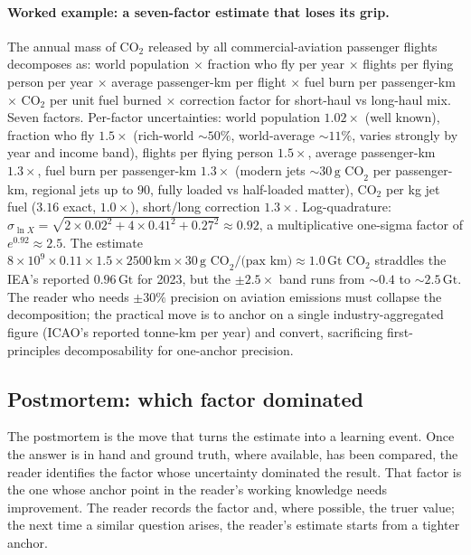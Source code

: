 \paragraph{Worked example: a seven-factor estimate that loses
its grip.} The annual mass of CO$_2$ released by all
commercial-aviation passenger flights decomposes as: world
population $\times$ fraction who fly per year $\times$ flights
per flying person per year $\times$ average passenger-km per
flight $\times$ fuel burn per passenger-km $\times$ CO$_2$ per
unit fuel burned $\times$ correction factor for short-haul vs
long-haul mix. Seven factors. Per-factor uncertainties: world
population $1.02\times$ (well known), fraction who fly $1.5\times$
(rich-world $\sim 50\%$, world-average $\sim 11\%$, varies
strongly by year and income band), flights per flying person
$1.5\times$, average passenger-km $1.3\times$, fuel burn per
passenger-km $1.3\times$ (modern jets $\sim 30\,\text{g CO}_2$
per passenger-km, regional jets up to $90$, fully loaded vs
half-loaded matter), CO$_2$ per kg jet fuel ($3.16$ exact,
$1.0\times$), short/long correction $1.3\times$. Log-quadrature:
$\sigma_{\ln X} = \sqrt{2 \times 0.02^{2} + 4 \times 0.41^{2} +
0.27^{2}} \approx 0.92$, a multiplicative one-sigma factor of
$e^{0.92} \approx 2.5$. The estimate $8 \times 10^{9} \times
0.11 \times 1.5 \times 2500\,\text{km} \times 30\,\text{g CO}_2/
\text{(pax km)} \approx 1.0\,\text{Gt CO}_2$ straddles the IEA's
reported $0.96\,\text{Gt}$ for 2023, but the $\pm 2.5\times$
band runs from $\sim 0.4$ to $\sim 2.5\,\text{Gt}$. The reader
who needs $\pm 30\%$ precision on aviation emissions must
collapse the decomposition; the practical move is to anchor on
a single industry-aggregated figure (ICAO's reported tonne-km
per year) and convert, sacrificing first-principles
decomposability for one-anchor precision.

\subsection{Postmortem: which factor dominated}

The postmortem is the move that turns the estimate into a learning
event. Once the answer is in hand and ground truth, where available,
has been compared, the reader identifies the factor whose uncertainty
dominated the result. That factor is the one whose anchor point in the
reader's working knowledge needs improvement. The reader records the
factor and, where possible, the truer value; the next time a similar
question arises, the reader's estimate starts from a tighter anchor.

